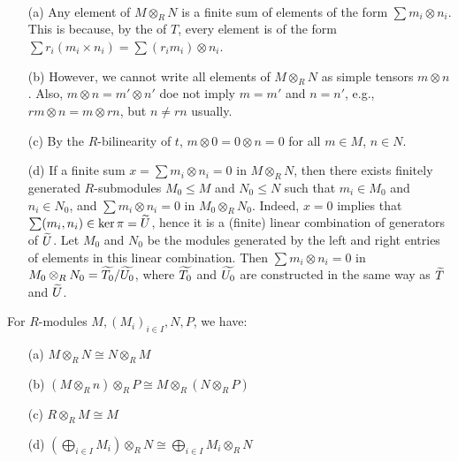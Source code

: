 \documentclass[11pt]{book}
\theoremstyle{definition}   \newtheorem{defn}[counter]{Definition} %
\newcommand{\vs}{\vspace{8pt}}   \newcommand{\hs}{\hspace{8pt}}
\numberwithin{counter}{chapter}
\begin{document}
\vs

\begin{remark}\ 
\begin{enumerate}
\item[(a)] Any element of $M \otimes_R N$ is a finite sum of elements of the form $\sum m_i \otimes n_i$. This is because, by the of $T$, every element is of the form $\sum r_i (m_i \times n_i) = \sum (r_i m_i) \otimes n_i$. 

\item[(b)] However, we cannot write all elements of $M\otimes_R N$ as simple tensors $m \otimes n$. Also, $m \otimes n = m' \otimes n'$ doe not imply $m = m'$ and $n = n'$, e.g., $rm \otimes n = m \otimes rn$, but $n \ne rn$ usually. 

\item[(c)]By the $R$-bilinearity of $t$, $m \otimes 0 = 0 \otimes n = 0$ for all $m \in M$, $n \in N$.

\item[(d)] If a finite sum $x = \sum m_i \otimes n_i = 0$ in $M \otimes_R N$, then there exists finitely generated $R$-submodules $M_0 \leq M$ and $N_0 \leq N$ such that $m_i \in M_0$ and $n_i \in N_0$, and $\sum m_i \otimes n_i = 0$ in $M_0 \otimes_R N_0$. Indeed, $x = 0$ implies that $\sum (m_i,n_i) \in \ker \pi = \widetilde{U}$, hence it is a (finite) linear combination of generators of $\widetilde{U}$. Let $M_0$ and $N_0$ be the modules generated by the left and right entries of elements in this linear combination. Then $\sum m_i \otimes n_i = 0$ in $M_0 \otimes_R N_0 = \widetilde{T_0}/\widetilde{U_0}$, where $\widetilde{T_0}$ and $\widetilde{U_0}$ are constructed in the same way as $\widetilde{T}$ and $\widetilde{U}$. 
\end{enumerate}
\end{remark}

\vs

\begin{lemma}
For $R$-modules $M, (M_i)_{i \in I}, N, P$, we have:
\begin{enumerate}
\item[(a)] $M \otimes_R N \cong N \otimes_R M$
\item[(b)] $(M \otimes_R n) \otimes_R P \cong M \otimes_R (N \otimes_R P)$
\item[(c)] $R \otimes_R M \cong M$
\item[(d)] $\left(\bigoplus_{i \in I} M_i\right) \otimes_R N \cong \bigoplus_{i \in I} M_i \otimes_R N$
\end{enumerate}
\end{lemma}
\end{document}
